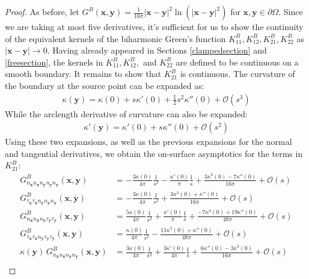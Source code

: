 \documentclass[preprint,12pt,3p]{elsarticle}
\begin{document}
\begin{proof}
As before, let $G^{B}(\mathbf{x},\mathbf{y}) = \frac{1}{16\pi}|\mathbf{x}-\mathbf{y}|^2 \ln(|\mathbf{x}-\mathbf{y}|^2)$ for $\mathbf{x}, \mathbf{y} \in \partial \Omega$. Since we are taking at most five derivatives, it's sufficient for us to show the continuity of the equivalent kernels of the biharmonic Green's function  $ K^{B}_{11}, K^B_{12}, K^B_{21}, K^B_{22} $ as $|\mathbf{x}-\mathbf{y}| \to 0$. Having already appeared in Sections \ref{clampedsection} and \ref{freesection}, the kernels in $K^B_{11}, K^B_{12},$ and $K^B_{22}$ are defined to be continuous on a smooth boundary. It remains to show that $K^B_{21}$ is continuous. The curvature of the boundary at the source point can be expanded as:
\begin{align}
    \kappa(\mathbf{y}) = \kappa(0) + s \kappa'(0) + \frac{1}{2} s^2 \kappa''(0) +  \mathcal{O}(s^3)
\end{align}
While the arclength derivative of curvature can also be expanded: 
\begin{align}
    \kappa'(\mathbf{y}) = \kappa'(0) + s \kappa''(0) +  \mathcal{O}(s^2)
\end{align}
Using these two expansions, as well as the previous expansions for the normal and tangential derivatives, we obtain the on-surface asymptotics for the terms in $K^B_{21}$:
\begin{align}
        G^{B}_{n_\mathbf{x} n_\mathbf{x} n_\mathbf{y} n_\mathbf{y} n_\mathbf{y} } (\mathbf{x},\mathbf{y}) &= - \frac{3 \kappa(0)}{4\pi} \frac{1}{s^2} - \frac{ \kappa'(0)}{ \pi } \frac{1}{s} + \frac{3 \kappa^3(0) - 7 \kappa''(0)}{16 \pi} + \mathcal{O}(s) \\
        G^{B}_{\tau_\mathbf{x} \tau_\mathbf{x} n_\mathbf{y} n_\mathbf{y} n_\mathbf{y} } (\mathbf{x},\mathbf{y}) &= -\frac{3 \kappa(0)}{4\pi} \frac{1}{s^2} + \frac{3 \kappa^3(0) + \kappa''(0)}{16 \pi} + \mathcal{O}(s) \\
        G^B_{ n_{\mathbf{x}} n_{\mathbf{x}} n_\mathbf{y} \tau_\mathbf{y} \tau_\mathbf{y}} (\mathbf{x}, \mathbf{y}) &= \frac{5\kappa(0)}{4\pi}\frac{1}{s^2} + \frac{\kappa'(0)}{\pi} \frac{1}{s}+ \frac{-7\kappa^3(0) + 19\kappa''(0)}{48\pi} + \mathcal{O}(s) \\
        G^B_{\tau_\mathbf{x} \tau_\mathbf{x} n_\mathbf{y} \tau_\mathbf{y} \tau_\mathbf{y}} (\mathbf{x}, \mathbf{y}) &= \frac{\kappa(0)}{4\pi} \frac{1}{s^2} - \frac{11 \kappa^3(0) + \kappa''(0)}{48 \pi} + \mathcal{O}(s) \\
        \kappa(\mathbf{y}) \, G^B_{n_\mathbf{x} n_\mathbf{x} n_\mathbf{y} n_\mathbf{y}} (\mathbf{x}, \mathbf{y}) &= \frac{3 \kappa(0)}{4 \pi  } \frac{1}{s^2} +\frac{3 \kappa'(0)}{4 \pi  }\frac{1}{s} +\frac{6 \kappa''(0) - 3 \kappa^3(0)}{16 \pi } + \mathcal{O}(s) \\

\end{align}
\end{proof}
\end{document}
